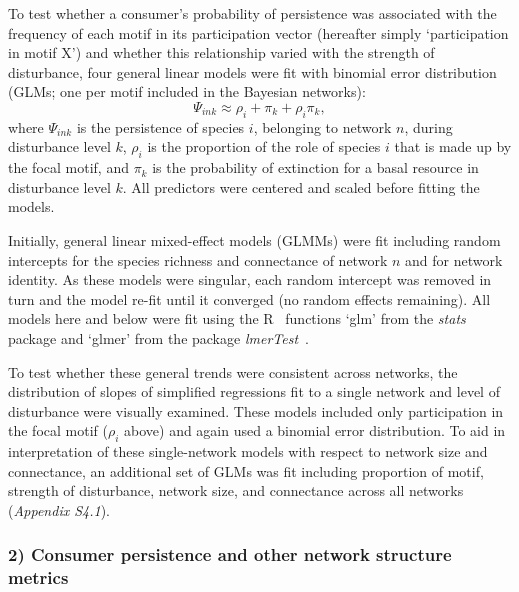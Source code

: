 \documentclass[12pt]{article}
\begin{document}
\begin{spacing}{2.0}
            To test whether a consumer's probability of persistence was associated with the frequency of each motif in its participation vector (hereafter simply `participation in motif X') and whether this relationship varied with the strength of disturbance, four general linear models were fit with binomial error distribution (GLMs; one per motif included in the Bayesian networks):
            \begin{equation}
            \Psi_{ink} \approx \rho_{i} + \pi_{k} + \rho_{i}\pi_{k} ,
            \label{propreq}
            \end{equation}
            \noindent where $\Psi_{ink}$ is the persistence of species $i$, belonging to network $n$, during disturbance level $k$, $\rho_{i}$ is the proportion of the role of species $i$ that is made up by the focal motif, and $\pi_k$ is the probability of extinction for a basal resource in disturbance level $k$.
            All predictors were centered and scaled before fitting the models.
            
      
            Initially, general linear mixed-effect models (GLMMs) were fit including random  intercepts for the species richness and connectance of network $n$ and for network identity.
            As these models were singular, each random intercept was removed in turn and the model re-fit until it converged (no random effects remaining).
            All models here and below were fit using the R~\citep{R} functions `glm' from the \emph{stats} package and `glmer' from the package \emph{lmerTest}~\citep{lmerTest}.
            
            
            To test whether these general trends were consistent across networks, the distribution of slopes of simplified regressions fit to a single network and level of disturbance were visually examined.
            These models included only participation in the focal motif ($\rho_{i}$ above) and again used a binomial error distribution.
            To aid in interpretation of these single-network models with respect to network size and connectance, an additional set of GLMs was fit including proportion of motif, strength of disturbance, network size, and connectance across all networks (\emph{Appendix S4.1}).



        \subsubsection*{2) Consumer persistence and other network structure metrics}


\end{spacing}
\end{document}
